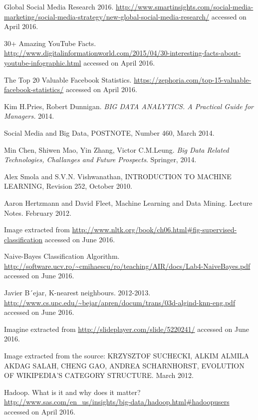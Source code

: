 \begin{thebibliography}{99999}
\singlespace\normalsize

 Global Social Media Research 2016. \url{http://www.smartinsights.com/social-media-marketing/social-media-strategy/new-global-social-media-research/} accessed on April 2016.

 30+ Amazing YouTube Facts. \url{http://www.digitalinformationworld.com/2015/04/30-interesting-facts-about-youtube-infographic.html} accessed on April 2016.

 The Top 20 Valuable Facebook Statistics. \url{https://zephoria.com/top-15-valuable-facebook-statistics/} accessed on April 2016.

 Kim H.Pries, Robert Dunnigan. \textit{BIG DATA ANALYTICS. A Practical Guide for Managers.} 2014.

 Social Media and Big Data, POSTNOTE, Number 460, March 2014.

 Min Chen, Shiwen Mao, Yin Zhang, Victor C.M.Leung. \textit{Big Data Related Technologies, Challanges and Future Prospects}. Springer, 2014.

 Alex Smola and S.V.N. Vishwanathan, INTRODUCTION TO MACHINE LEARNING, Revision 252, October 2010.

 Aaron Hertzmann and David Fleet, Machine Learning and Data Mining. Lecture Notes. February 2012.

 Image extracted from \url{http://www.nltk.org/book/ch06.html#fig-supervised-classification} accessed on June 2016.

 Naive-Bayes Classification Algorithm. \url{http://software.ucv.ro/~cmihaescu/ro/teaching/AIR/docs/Lab4-NaiveBayes.pdf} accessed on June 2016.

 Javier B´ejar, K-nearest neighbours. 2012-2013. \url{http://www.cs.upc.edu/~bejar/apren/docum/trans/03d-algind-knn-eng.pdf} accessed on June 2016.

 Imagine extracted from \url{http://slideplayer.com/slide/5220241/} accessed on June 2016.

 Image extracted from the source: KRZYSZTOF SUCHECKI, ALKIM ALMILA AKDAG SALAH, CHENG GAO, ANDREA SCHARNHORST, EVOLUTION OF WIKIPEDIA’S CATEGORY STRUCTURE. March 2012.

 Hadoop. What is it and why does it matter? \url{http://www.sas.com/en_us/insights/big-data/hadoop.html#hadoopusers} accessed on April 2016.


\end{thebibliography}
